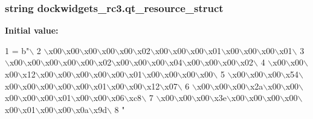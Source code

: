 \hypertarget{namespacedockwidgets__rc3_a07328a2daf3aaaf71e388ed28024ae31}{}
\subsubsection[{qt\+\_\+resource\+\_\+struct}]{\setlength{\rightskip}{0pt plus 5cm}string dockwidgets\+\_\+rc3.\+qt\+\_\+resource\+\_\+struct}\label{namespacedockwidgets__rc3_a07328a2daf3aaaf71e388ed28024ae31}
{\bfseries Initial value\+:}
\begin{DoxyCode}
1 = b\textcolor{stringliteral}{"\(\backslash\)}
2 \textcolor{stringliteral}{\(\backslash\)x00\(\backslash\)x00\(\backslash\)x00\(\backslash\)x00\(\backslash\)x00\(\backslash\)x02\(\backslash\)x00\(\backslash\)x00\(\backslash\)x00\(\backslash\)x01\(\backslash\)x00\(\backslash\)x00\(\backslash\)x00\(\backslash\)x01\(\backslash\)}
3 \textcolor{stringliteral}{\(\backslash\)x00\(\backslash\)x00\(\backslash\)x00\(\backslash\)x00\(\backslash\)x00\(\backslash\)x02\(\backslash\)x00\(\backslash\)x00\(\backslash\)x00\(\backslash\)x04\(\backslash\)x00\(\backslash\)x00\(\backslash\)x00\(\backslash\)x02\(\backslash\)}
4 \textcolor{stringliteral}{\(\backslash\)x00\(\backslash\)x00\(\backslash\)x00\(\backslash\)x12\(\backslash\)x00\(\backslash\)x00\(\backslash\)x00\(\backslash\)x00\(\backslash\)x00\(\backslash\)x01\(\backslash\)x00\(\backslash\)x00\(\backslash\)x00\(\backslash\)x00\(\backslash\)}
5 \textcolor{stringliteral}{\(\backslash\)x00\(\backslash\)x00\(\backslash\)x00\(\backslash\)x54\(\backslash\)x00\(\backslash\)x00\(\backslash\)x00\(\backslash\)x00\(\backslash\)x00\(\backslash\)x01\(\backslash\)x00\(\backslash\)x00\(\backslash\)x12\(\backslash\)x07\(\backslash\)}
6 \textcolor{stringliteral}{\(\backslash\)x00\(\backslash\)x00\(\backslash\)x00\(\backslash\)x2a\(\backslash\)x00\(\backslash\)x00\(\backslash\)x00\(\backslash\)x00\(\backslash\)x00\(\backslash\)x01\(\backslash\)x00\(\backslash\)x00\(\backslash\)x06\(\backslash\)xc8\(\backslash\)}
7 \textcolor{stringliteral}{\(\backslash\)x00\(\backslash\)x00\(\backslash\)x00\(\backslash\)x3e\(\backslash\)x00\(\backslash\)x00\(\backslash\)x00\(\backslash\)x00\(\backslash\)x00\(\backslash\)x01\(\backslash\)x00\(\backslash\)x00\(\backslash\)x0a\(\backslash\)x9d\(\backslash\)}
8 \textcolor{stringliteral}{"}
\end{DoxyCode}
